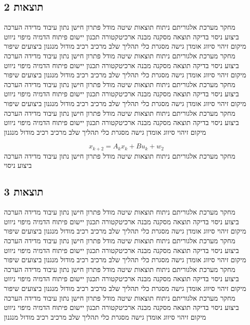\subsection{תוצאות 2}
\label{sub:ch08_2}
מחקר מערכת אלגוריתם ניתוח תוצאות שיטה מודל פתרון חישן נתון עיבוד מדידה הערכה ביצוע ניסוי בדיקה תוצאה מסקנה מבנה ארכיטקטורה תכנון יישום פיתוח הדמיה מיפוי ניווט מיקום זיהוי סיווג אומדן גישה מסגרת כלי תהליך שלב מרכיב רכיב מודול מנגנון ביצועים שיפור מחקר מערכת אלגוריתם ניתוח תוצאות שיטה מודל פתרון חישן נתון עיבוד מדידה הערכה ביצוע ניסוי בדיקה תוצאה מסקנה מבנה ארכיטקטורה תכנון יישום פיתוח הדמיה מיפוי ניווט מיקום זיהוי סיווג אומדן גישה מסגרת כלי תהליך שלב מרכיב רכיב מודול מנגנון ביצועים שיפור מחקר מערכת אלגוריתם ניתוח תוצאות שיטה מודל פתרון חישן נתון עיבוד מדידה הערכה ביצוע ניסוי בדיקה תוצאה מסקנה מבנה ארכיטקטורה תכנון יישום פיתוח הדמיה מיפוי ניווט מיקום זיהוי סיווג אומדן גישה מסגרת כלי תהליך שלב מרכיב רכיב מודול מנגנון ביצועים שיפור מחקר מערכת אלגוריתם ניתוח תוצאות שיטה מודל פתרון חישן נתון עיבוד מדידה הערכה ביצוע ניסוי בדיקה תוצאה מסקנה מבנה ארכיטקטורה תכנון יישום פיתוח הדמיה מיפוי ניווט מיקום זיהוי סיווג אומדן גישה מסגרת כלי תהליך שלב מרכיב רכיב מודול מנגנון

\begin{equation}
    x_{k+2} = A_{k} x_k + B u_{k} + w_{2}
    \label{eq:ch08_2}
\end{equation}
מחקר מערכת אלגוריתם ניתוח תוצאות שיטה מודל פתרון חישן נתון עיבוד מדידה הערכה ביצוע ניסוי

\subsection{תוצאות 3}
\label{sub:ch08_3}
מחקר מערכת אלגוריתם ניתוח תוצאות שיטה מודל פתרון חישן נתון עיבוד מדידה הערכה ביצוע ניסוי בדיקה תוצאה מסקנה מבנה ארכיטקטורה תכנון יישום פיתוח הדמיה מיפוי ניווט מיקום זיהוי סיווג אומדן גישה מסגרת כלי תהליך שלב מרכיב רכיב מודול מנגנון ביצועים שיפור מחקר מערכת אלגוריתם ניתוח תוצאות שיטה מודל פתרון חישן נתון עיבוד מדידה הערכה ביצוע ניסוי בדיקה תוצאה מסקנה מבנה ארכיטקטורה תכנון יישום פיתוח הדמיה מיפוי ניווט מיקום זיהוי סיווג אומדן גישה מסגרת כלי תהליך שלב מרכיב רכיב מודול מנגנון ביצועים שיפור מחקר מערכת אלגוריתם ניתוח תוצאות שיטה מודל פתרון חישן נתון עיבוד מדידה הערכה ביצוע ניסוי בדיקה תוצאה מסקנה מבנה ארכיטקטורה תכנון יישום פיתוח הדמיה מיפוי ניווט מיקום זיהוי סיווג אומדן גישה מסגרת כלי תהליך שלב מרכיב רכיב מודול מנגנון ביצועים שיפור מחקר מערכת אלגוריתם ניתוח תוצאות שיטה מודל פתרון חישן נתון עיבוד מדידה הערכה ביצוע ניסוי בדיקה תוצאה מסקנה מבנה ארכיטקטורה תכנון יישום פיתוח הדמיה מיפוי ניווט מיקום זיהוי סיווג אומדן גישה מסגרת כלי תהליך שלב מרכיב רכיב מודול מנגנון


